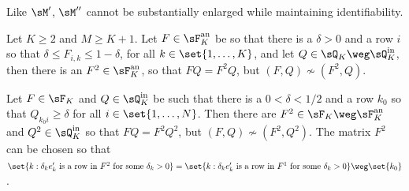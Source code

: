 \documentclass[12pt,a4paper]{article}
\begin{document}
            
            

Like $\sM'$, $\sM''$ cannot be substantially enlarged while maintaining identifiability. 
\begin{theorem}\label{thm:identifiabilityanchorinFcounterexample}
 Let $K\ge 2$ and $M\ge K+1$. 
    Let $F\in \sF_K^{\text{an}}$ be so that there is a $\delta>0$ and a row $i$ so  that $\delta\le F_{i,k}\le 1-\delta$, for all $k\in\set{1,\ldots, K}$, and let $Q\in\sQ_K\weg\sQ_K^{\text{in}}$,  then there is an $F^2\in\sF_K^{\text{an}}$, so that $FQ=F^2Q$, but $(F,Q)\not\sim (F^2,Q)$. 

Let $F\in\sF_K$ and $Q\in\sQ_K^{\text{in}}$ be such that there is a  $0<\delta<1/2$ and a row $k_0$ so that $ Q_{k_0i}\ge \delta$ for all $i\in\set{1,\ldots,N}$.
     Then there are $F^2\in \sF_K\weg\sF_K^{\text{an}}$ and $Q^2\in \sQ_K^{\text{in}}$ so that $FQ=F^2Q^2$, but $(F,Q)\not\sim (F^2,Q^2)$. The matrix $F^2$ can be chosen so that $\set{k:\delta_ke_k'\text{ is a row in }F^2\text{ for some }\delta_k>0}=\set{k:\delta_ke_k'\text{ is a row in }F^1\text{ for some }\delta_k>0}\weg\set {k_0}$. 
\end{theorem}
\end{document}
